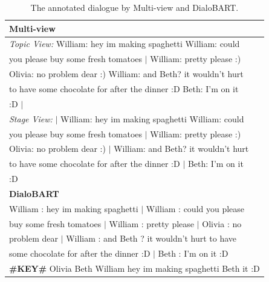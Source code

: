 \documentclass[letterpaper]{article} %
\begin{document}

\begin{table}[h]
	\centering
	\small
	\begin{tabular}{l}
		\toprule[1pt]
		\textbf{Multi-view} \\
		\hline
		\textit{Topic View:} William: hey im making spaghetti William: could\\ you please buy some fresh tomatoes \textbf{$\mid$} William: pretty please :) \\Olivia: no problem dear :) William: and Beth? it wouldn't hurt\\ to have some chocolate for after the dinner :D Beth: I'm on it\\ :D \textbf{$\mid$}\\
		\textit{Stage View:} \textbf{$\mid$} William: hey im making spaghetti William: could\\you please buy some fresh tomatoes \textbf{$\mid$} William: pretty please :) \\Olivia: no problem dear :) \textbf{$\mid$} William: and Beth? it wouldn't hurt\\to have some chocolate for after the dinner :D \textbf{$\mid$} Beth: I'm on it\\:D\\
		\hline
		\textbf{DialoBART} \\
		\hline
		William : hey im making spaghetti \textbf{$\mid$} William : could you please\\buy some fresh tomatoes \textbf{$\mid$} William : pretty please \textbf{$\mid$} Olivia : no\\problem dear \textbf{$\mid$} William : and Beth ? it wouldn't hurt to have\\ some chocolate for after the dinner :D \textbf{$\mid$} Beth : I'm on it :D \\\textbf{\#KEY\#} Olivia Beth William hey im making spaghetti Beth it :D\\
		\bottomrule[1pt]
	\end{tabular}
	\caption{The annotated dialogue by Multi-view and DialoBART.}
	\label{tab:annodial}
\end{table}
\end{document}
